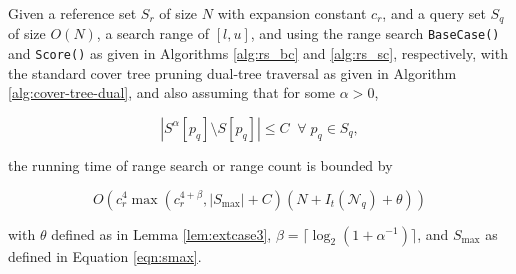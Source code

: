 \begin{thm}
Given a reference set $S_r$ of size $N$ with expansion constant $c_r$, and a
query set $S_q$ of size $O(N)$, a search range of $[l, u]$, and using the range
search \texttt{BaseCase()} and \texttt{Score()} as given in Algorithms
\ref{alg:rs_bc} and \ref{alg:rs_sc}, respectively, with the standard cover tree
pruning dual-tree traversal as given in Algorithm \ref{alg:cover-tree-dual}, and
also assuming that for some $\alpha > 0$,

\begin{equation}
| S^{\alpha}[p_q] \setminus S[p_q] | \le C \; \; \forall \; p_q \in S_q,
\end{equation}


\noindent the running time of range search or range count is bounded by

\begin{equation}
O\left(c_r^{4} \max\left(c_r^{4 + \beta}, |S_{\max}| + C\right) (N +
I_t(\mathscr{N}_q) + \theta)
\right)
\end{equation}

with $\theta$ defined as in Lemma \ref{lem:extcase3},
$\beta = \lceil \log_2 (1 + \alpha^{-1}) \rceil$, and $S_{\max}$ as defined in
Equation \ref{eqn:smax}.
\label{thm:rs}
\end{thm}

